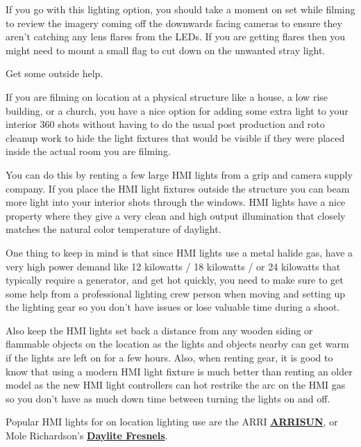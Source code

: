 \begin{fullwidth}

If you go with this lighting option, you should take a moment on set while filming to review the imagery coming off the downwards facing cameras to ensure they aren't catching any lens flares from the LEDs. If you are getting flares then you might need to mount a small flag to cut down on the unwanted stray light.

{\large Get some outside help. \par}

If you are filming on location at a physical structure like a house, a low rise building, or a church, you have a nice option for adding some extra light to your interior 360 shots without having to do the usual post production and roto cleanup work to hide the light fixtures that would be visible if they were placed inside the actual room you are filming. 

You can do this by renting a few large HMI lights from a grip and camera supply company. If you place the HMI light fixtures outside the structure you can beam more light into your interior shots through the windows. HMI lights have a nice property where they give a very clean and high output illumination that closely matches the natural color temperature of daylight.


One thing to keep in mind is that since HMI lights use a metal halide gas, have a very high power demand like 12 kilowatts / 18 kilowatts / or 24 kilowatts that typically require a generator, and get hot quickly, you need to make sure to get some help from a professional lighting crew person when moving and setting up the lighting gear so you don't have issues or lose valuable time during a shoot.

Also keep the HMI lights set back a distance from any wooden siding or flammable objects on the location as the lights and objects nearby can get warm if the lights are left on for a few hours. Also, when renting gear, it is good to know that using a modern HMI light fixture is much better than renting an older model as the new HMI light controllers can hot restrike the arc on the HMI gas so you don't have as much down time between turning the lights on and off.


Popular HMI lights for on location lighting use are the ARRI \textbf{\href{http://www.arri.com/lighting/lighting_equipment/lampheads/daylight_hmi_lampheads/}{ARRISUN}}, or Mole Richardson's \textbf{\href{http://mole.com/products/index/daylite-fesnels}{Daylite Fresnels}}.


\clearpage
\end{fullwidth}